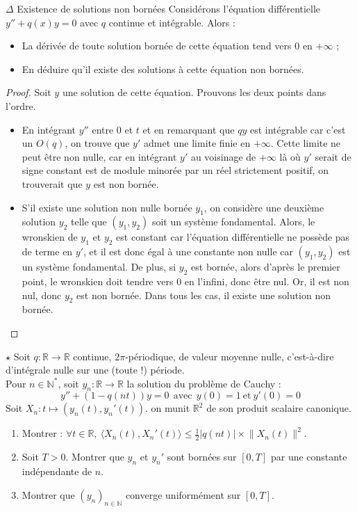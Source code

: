 \documentclass[french,a4paper]{article}
\newcommand{\N}{\mathbb{N}}
\newcommand{\R}{\mathbb{R}}
\newcommand{\st}{^*}
\theoremstyle{plain}
\theoremstyle{definition}
\theoremstyle{remark}
\begin{document}
\begin{ex}[Moulin.ED.50]{$\Delta$ Existence de solutions non bornées} Considérons l'équation différentielle $y''+q(x)y=0$ avec $q$ continue et intégrable. Alors :
	\begin{itemize}
		\item La dérivée de toute solution bornée de cette équation tend vers $0$ en $+\infty$ ;
		\item En déduire qu'il existe des solutions à cette équation non bornées.
	\end{itemize}
\end{ex}
\begin{proof}
	Soit $y$ une solution de cette équation. Prouvons les deux points dans l'ordre.
	\begin{itemize}
		\item En intégrant $y''$ entre $0$ et $t$ et en remarquant que $qy$ est intégrable car c'est un $O(q)$, on trouve que $y'$ admet une limite finie en $+\infty$. Cette limite ne peut être non nulle, car en intégrant $y'$ au voisinage de $+\infty$ là où $y'$ serait de signe constant est de module minorée par un réel strictement positif, on trouverait que $y$ est non bornée.
		\item S'il existe une solution non nulle bornée $y_1$, on considère une deuxième solution $y_2$ telle que $(y_1,y_2)$ soit un système fondamental. Alors, le wronskien de $y_1$ et $y_2$ est constant car l'équation différentielle ne possède pas de terme en $y'$, et il est donc égal à une constante non nulle car $(y_1,y_2)$ est un système fondamental. De plus, si $y_2$ est bornée, alors d'après le premier point, le wronskien doit tendre vers $0$ en l'infini, donc être nul. Or, il est non nul, donc $y_2$ est non bornée. Dans tous les cas, il existe une solution non bornée.
	\end{itemize}
\end{proof}

\begin{ex}[Moulin.ED.51]{$\star$}
	Soit $q:\R\to\R$ continue, $2\pi$-périodique, de valeur moyenne nulle, c'est-à-dire d'intégrale nulle sur une (toute !) période. \\ Pour $n\in\N\st$, soit $y_n:\R\to\R$ la solution du problème de Cauchy : $$y''+(1-q(nt))y=0\ \ \text{avec}\ \ y(0)=1\ \text{et}\ y'(0)=0$$
	Soit $X_n:t\mapsto(y_n(t),y_n'(t))$. on munit $\R^2$ de son produit scalaire canonique.
	\begin{enumerate}
		\item Montrer : $\displaystyle\forall t\in\R,\ \langle X_n(t),X_n'(t)\rangle\leqslant\frac{1}{2}\lvert q(nt)\rvert\times\lVert X_n(t)\rVert^2$.
		\item Soit $T>0$. Montrer que $y_n$ et $y_n'$ sont bornées sur $[0,T]$ par une constante indépendante de $n$.
		\item Montrer que $(y_n)_{n\in\N}$ converge uniformément sur $[0,T]$.
	\end{enumerate}
\end{ex}
\end{document}
